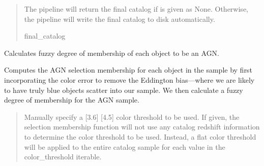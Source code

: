 \documentclass[letterpaper,12pt,english]{sphinxmanual}
\begin{document}
\begin{fulllineitems}
\begin{fulllineitems}
\begin{quote}
\begin{description}
\begin{itemize}
\end{itemize}

\sphinxAtStartPar
The pipeline will return the final catalog if  is given as None. Otherwise, the pipeline will
write the final catalog to disk automatically.

\sphinxAtStartPar
final\_catalog

\end{description}\end{quote}

\end{fulllineitems}


\begin{fulllineitems}
\label{\detokenize{api/selector:SPTclIRAGN.Pipeline_functions.SelectIRAGN.selection_membership}}
\pysigstartsignatures
{}
\pysigstopsignatures
\sphinxAtStartPar
Calculates fuzzy degree of membership of each object to be an AGN.

\sphinxAtStartPar
Computes the AGN selection membership for each object in the sample by first incorporating the color error to
remove the Eddington bias—where we are likely to have truly blue objects scatter into our sample. We then
calculate a fuzzy degree of membership for the AGN sample.
\begin{quote}\begin{description}
\sphinxAtStartPar
{} \textendash{} Manually specify a {[}3.6{]} \sphinxhyphen{} {[}4.5{]} color threshold to be used. If given, the selection membership function
will not use any catalog redshift information to determine the color threshold to be used. Instead, a flat
color threshold will be applied to the entire catalog sample for each value in the color\_threshold iterable.

\end{description}\end{quote}

\end{fulllineitems}
\end{fulllineitems}
\end{document}
